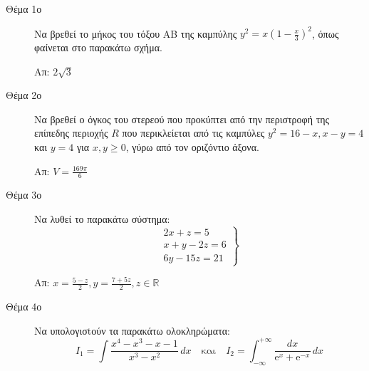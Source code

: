 







\begin{center}
\textcolor{Col1}{}
\end{center}

\vspace{\baselineskip}

\begin{description}
  \item [Θέμα 1ο]
    Να βρεθεί το μήκος του τόξου ΑΒ της καμπύλης $ y^{2}=x(1- \frac{x}{3})^{2} $, 
    όπως φαίνεται στο παρακάτω σχήμα.
    \hfill Απ: $ 2 \sqrt{3} $ 

  \item [Θέμα 2ο] 
    Να βρεθεί ο όγκος του στερεού που προκύπτει από την περιστροφή της επίπεδης περιοχής 
    $R$ που περικλείεται από τις καμπύλες $ y^{2}=16-x, x-y=4 $ και $ y=4 $ για 
    $ x,y \geq 0 $, γύρω από τον οριζόντιο άξονα.

    \hfill Απ: $ V = \frac{169 \pi }{6} $ 

  \item [Θέμα 3ο] Να λυθεί το παρακάτω σύστημα:
    \[
      \left.
        \begin{matrix}
          2x+z=5 \\
          x+y-2z=6 \\
          6y-15z=21
        \end{matrix} 
      \right\} 
    \] 

    \hfill Απ: $ x = \frac{5-z}{2} , y = \frac{7+5z}{2} , z \in \mathbb{R} $  

  \item [Θέμα 4ο] 
    Να υπολογισtούν τα παρακάτω ολοκληρώματα:
    \[
      I_{1} = \int \frac{x^{4}-x^{3}-x-1}{x^3-x^{2}} \,{dx} \quad 
      \text{και} \quad I_{2} = \int _{- \infty}^{+\infty} 
      \frac{dx}{\mathrm{e}^{x} + \mathrm{e}^{-x}} \,{dx} 
    \] 


\end{description}
